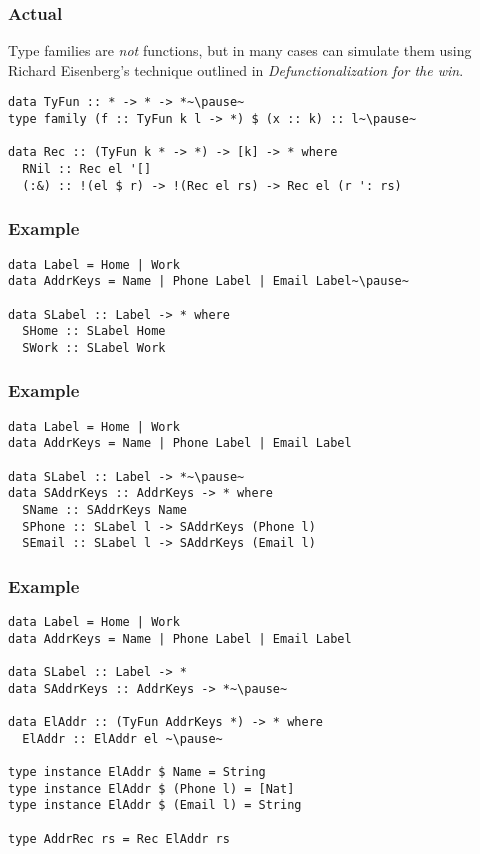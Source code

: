 \documentclass[tikz, 12pt]{beamer}
\begin{document}
\begin{frame}[fragile]
  \frametitle{Actual}
  Type families are \emph{not} functions, but in many cases can simulate them using Richard Eisenberg's technique outlined in \emph{Defunctionalization for the win}.
  \begin{lstlisting}
data TyFun :: * -> * -> *~\pause~
type family (f :: TyFun k l -> *) $ (x :: k) :: l~\pause~

data Rec :: (TyFun k * -> *) -> [k] -> * where
  RNil :: Rec el '[]
  (:&) :: !(el $ r) -> !(Rec el rs) -> Rec el (r ': rs)
  \end{lstlisting}
\end{frame}

\begin{frame}[fragile]
  \frametitle{Example}
  \begin{lstlisting}
data Label = Home | Work
data AddrKeys = Name | Phone Label | Email Label~\pause~

data SLabel :: Label -> * where
  SHome :: SLabel Home
  SWork :: SLabel Work
  \end{lstlisting}
\end{frame}

\begin{frame}[fragile]
  \frametitle{Example}
  \begin{lstlisting}
data Label = Home | Work
data AddrKeys = Name | Phone Label | Email Label

data SLabel :: Label -> *~\pause~
data SAddrKeys :: AddrKeys -> * where
  SName :: SAddrKeys Name
  SPhone :: SLabel l -> SAddrKeys (Phone l)
  SEmail :: SLabel l -> SAddrKeys (Email l)
  \end{lstlisting}
\end{frame}

\begin{frame}[fragile]
  \frametitle{Example}
  \begin{lstlisting}
data Label = Home | Work
data AddrKeys = Name | Phone Label | Email Label

data SLabel :: Label -> *
data SAddrKeys :: AddrKeys -> *~\pause~

data ElAddr :: (TyFun AddrKeys *) -> * where
  ElAddr :: ElAddr el ~\pause~

type instance ElAddr $ Name = String
type instance ElAddr $ (Phone l) = [Nat]
type instance ElAddr $ (Email l) = String

type AddrRec rs = Rec ElAddr rs
  \end{lstlisting}
\end{frame}
\end{document}
